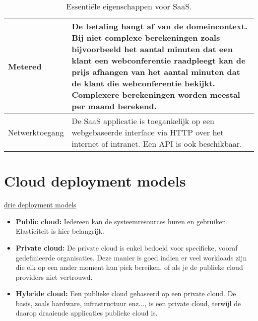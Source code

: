 \begin{itemize}
\begin{table}[ht]
\begin{tabular}{l | p{}}
				\hline
				Metered & De betaling hangt af van de domeincontext. Bij niet complexe berekeningen zoals bijvoorbeeld het aantal minuten dat een klant een webconferentie raadpleegt kan de prijs afhangen van het aantal minuten dat de klant die webconferentie bekijkt. Complexere berekeningen worden meestal per maand berekend.\\
				\hline
				Netwerktoegang & De SaaS applicatie is toegankelijk op een webgebaseerde interface via HTTP over het internet of intranet. Een API is ook beschikbaar.\\
				\hline
			\end{tabular}
			\caption{Essentiële eigenschappen voor SaaS.}
			\label{table:saas}
		\end{table}
	\end{itemize}

	\section{Cloud deployment models}
	\underline{drie deployment models}
	\begin{itemize}
		\item  \textbf{Public cloud:} Iedereen kan de systeemresources huren en gebruiken. Elasticiteit is hier belangrijk.
		\item  \textbf{Private cloud:} De private cloud is enkel bedoeld voor specifieke, vooraf gedefinieerde organisaties. Deze manier is goed indien er veel workloads zijn die elk op een ander moment hun piek bereiken, of als je de publieke cloud providers niet vertrouwd.
		\item  \textbf{Hybride cloud:} Een publieke cloud gebaseerd op een private cloud. De basis, zoals hardware, infrastructuur enz..., is een private cloud, terwijl de daarop draaiende applicaties publieke cloud is. 
	\end{itemize}

